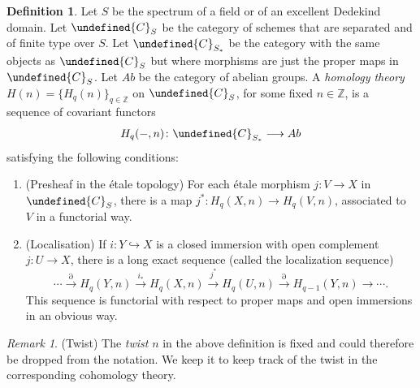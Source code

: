 \documentclass[10pt,a4paper]{article}
\let\cal\undefined
\numberwithin{equation}{section}
\newtheorem{Key lemma}[theorem]{Key lemma}
\theoremstyle{definition}
\newtheorem{definition}[theorem]{Definition}
\theoremstyle{remark}
\newtheorem{remark}[theorem]{Remark}
\newcommand{\bb}{\mathbb}
\newcommand{\To}{\longrightarrow}
\newcommand{\cal}{\mathcal}
\newcommand{\xTo}[1]{\stackrel{#1}{\To}}
\begin{document}
\begin{definition}\label{definition_homology}
Let $S$ be the spectrum of a field or of an excellent Dedekind domain. Let  $\cal{C}_{S}$ be the category of schemes that are separated and of finite type over $S$. Let  $\cal{C}_{S_*}$ be the category with the same objects as $\cal{C}_{S}$ but where morphisms are just the proper maps in  $\cal{C}_{S}$. Let $Ab$ be the category of abelian groups. A \textit{homology theory} $H(n)=\{H_q(n)\}_{q\in \bb Z}$ on $\cal{C}_{S}$, for some fixed $n\in \bb Z$, is a sequence of covariant functors
$$H_q(-,n)\colon\cal{C}_{S_*}\To Ab$$
satisfying the following conditions:
\begin{enumerate}
\item (Presheaf in the \'etale topology) For each \'etale morphism $j\colon V\to X$ in $\cal{C}_{S}$, there is a map $j^*\colon H_q(X,n)\to H_q(V,n)$, associated to $V$ in a functorial way. 
\item (Localisation) If $i\colon Y\hookrightarrow X$ is a closed immersion with open complement $j\colon U\to X$, there is a long exact sequence (called the localization sequence) 
  $$\cdots\overset{\partial}\To H_q(Y,n)\xTo{i_*}
  H_q(X,n)\xTo{j^*} H_q(U,n)\xTo{\partial} H_{q-1}(Y,n)\To\cdots .$$
This sequence is functorial with respect to proper maps and open immersions in an obvious way.
\end{enumerate}
\end{definition}

\begin{remark}(Twist) The \textit{twist} $n$ in the above definition is fixed and could therefore be dropped from the notation. We keep it to keep track of the twist in the corresponding cohomology theory. \end{remark}
\end{document}
